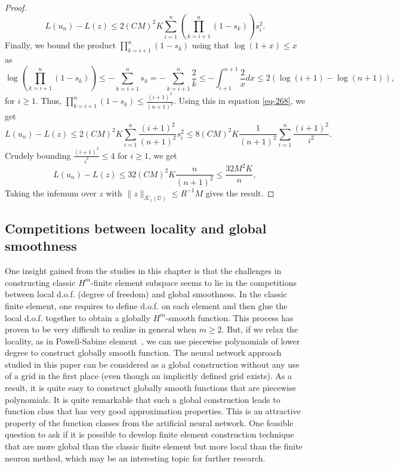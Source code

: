 \begin{proof}
\begin{equation}
  L(u_n) - L(z) \leq 2(CM)^2K\sum_{i=1}^n\left(\prod_{k=i+1}^n(1-s_k)\right)s_i^2.
 \end{equation}
 Finally, we bound the product $\displaystyle\prod_{k=i+1}^n(1-s_k)$ using that $\log(1+x) \leq x$ as
 \begin{equation}
  \log\left(\prod_{k=i+1}^n(1-s_k)\right) \leq -\sum_{k=i+1}^ns_k = -\sum_{k=i+1}^n\frac{2}{k} \leq -\int_{i+1}^{n+1}\frac{2}{x}dx \leq 2(\log(i+1) - \log(n+1)),
 \end{equation}
 for $i \geq 1$. Thus, $\prod_{k=i+1}^n(1-s_k) \leq \frac{(i+1)^2}{(n+1)^2}$. Using this in equation \eqref{eq-268}, we get
 \begin{equation}
  L(u_n) - L(z) \leq 2(CM)^2K\sum_{i=1}^n \frac{(i+1)^2}{(n+1)^2}s_i^2 \leq 8(CM)^2K\frac{1}{(n+1)^2}\sum_{i=1}^n \frac{(i+1)^2}{i^2}.
 \end{equation}
 Crudely bounding $\frac{(i+1)^2}{i^2} \leq 4$ for $i \geq 1$, we get
\begin{equation}
  L(u_n) - L(z) \leq 32(CM)^2K\frac{n}{(n+1)^2} \leq \frac{32M^2K}{n},
 \end{equation}
 Taking the infemum over $z$ with $\|z\|_{\mathcal{K}_1(\mathbb{D})} \leq R^{-1}M$ gives the result.
\end{proof}


\subsection{Competitions between locality and global smoothness}
One insight gained from the studies in this chapter is that the
challenges in constructing classic $H^m$-finite element subspace seems
to lie in the competitions between local d.o.f.  (degree of freedom)
and global smoothness.  In the classic finite element, one requires to
define d.o.f. on each element and then glue the local d.o.f. together
to obtain a globally $H^m$-smooth function. This process has proven to
be very difficult to realize in general when $m\ge 2$. But, if we relax the
locality, as in Powell-Sabine
element~\cite{powell1977piecewise}, we can use piecewise polynomials
of lower degree to construct globally smooth function. The neural
network approach studied in this paper can be considered as a global
construction without any use of a grid in the first place (even though
an implicitly defined grid exists). As a result, it is quite easy to
construct globally smooth functions that are piecewise polynomials. It
is quite remarkable that such a global construction
leads to function class that has very good approximation
properties. This is an attractive property of the function classes from
the artificial neural network.  One feasible question to ask if it is
possible to develop finite element construction technique that are
more global than the classic finite element but more  local than the
finite neuron method, which may be an interesting topic for
further research. 


